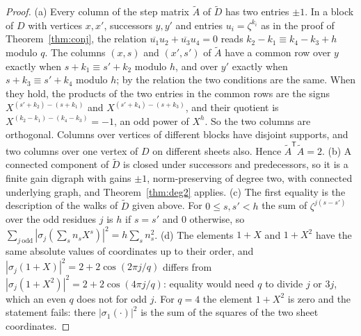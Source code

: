 \begin{proof}
(a) Every column of the step matrix $\tilde A$ of $\tilde D$ has two entries $\pm1$. In a block of $D$ with vertices $x,x'$, successors $y,y'$ and entries $u_i=\zeta^{k_i}$ as in the proof of Theorem~\ref{thm:conj}, the relation $\overline{u_1}u_2+\overline{u_3}u_4=0$ reads $k_2-k_1\equiv k_4-k_3+h$ modulo $q$. The columns $(x,s)$ and $(x',s')$ of $\tilde A$ have a common row over $y$ exactly when $s+k_1\equiv s'+k_2$ modulo $h$, and over $y'$ exactly when $s+k_3\equiv s'+k_4$ modulo $h$; by the relation the two conditions are the same. When they hold, the products of the two entries in the common rows are the signs $X^{(s'+k_2)-(s+k_1)}$ and $X^{(s'+k_4)-(s+k_3)}$, and their quotient is $X^{(k_2-k_1)-(k_4-k_3)}=-1$, an odd power of $X^h$. So the two columns are orthogonal. Columns over vertices of different blocks have disjoint supports, and two columns over one vertex of $D$ on different sheets also. Hence $\tilde A^{\mathsf T}\tilde A=2$. (b) A connected component of $\tilde D$ is closed under successors and predecessors, so it is a finite gain digraph with gains $\pm1$, norm-preserving of degree two, with connected underlying graph, and Theorem~\ref{thm:deg2} applies. (c) The first equality is the description of the walks of $\tilde D$ given above. For $0\le s,s'<h$ the sum of $\zeta^{j(s-s')}$ over the odd residues $j$ is $h$ if $s=s'$ and $0$ otherwise, so $\sum_{j\ \mathrm{odd}}|\sigma_j(\sum_sn_sX^s)|^2=h\sum_sn_s^2$. (d) The elements $1+X$ and $1+X^2$ have the same absolute values of coordinates up to their order, and $|\sigma_j(1+X)|^2=2+2\cos(2\pi j/q)$ differs from $|\sigma_j(1+X^2)|^2=2+2\cos(4\pi j/q)$: equality would need $q$ to divide $j$ or $3j$, which an even $q$ does not for odd $j$. For $q=4$ the element $1+X^2$ is zero and the statement fails: there $|\sigma_1(\cdot)|^2$ is the sum of the squares of the two sheet coordinates.
\end{proof}

